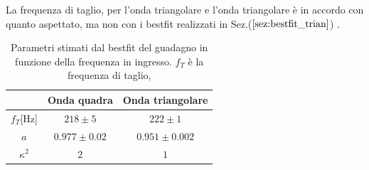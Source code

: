 \documentclass{article}
\begin{document}
        \noindent La frequenza di taglio, per l'onda triangolare e l'onda triangolare è
        in accordo con quanto aspettato, ma non con i bestfit realizzati in Sez.($\ref{sez:bestfit_trian}$) .

        \begin{table}[H]
            \centering
            \begin{tabular}{ccc}
                \hline
                            &Onda quadra        & Onda triangolare\\
                \hline
                $f_T$[Hz]  &$218\pm5$      & $222\pm1$\\
                $a$         &$0.977\pm0.02$    &   $0.951\pm0.002$\\
                $\kappa^2$        & $2  $             &   $1$ \\
            
                \hline
            \end{tabular}
            \caption{Parametri stimati dal bestfit del guadagno in funzione della frequenza in ingresso. $f_T$ è la frequenza di taglio, }
            \label{tab:results}
        \end{table}
        
        
\end{document}

